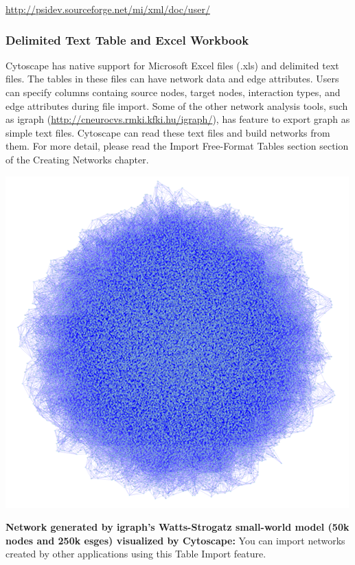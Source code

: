  \url{http://psidev.sourceforge.net/mi/xml/doc/user/}


 
\subsubsection*{Delimited Text Table and Excel Workbook}


 Cytoscape has native support for Microsoft Excel files (.xls) and delimited text files. The tables in these files can have network data and edge attributes. Users can specify columns containg source nodes, target nodes, interaction types, and edge attributes during file import. Some of the other network analysis tools, such as igraph (\url{http://cneurocvs.rmki.kfki.hu/igraph/}), has feature to export graph as simple text files. Cytoscape can read these text files and build networks from them. For more detail, please read the Import Free-Format Tables section section of the Creating Networks chapter. 


 \includegraphics[scale=1]{images/huge_network_igraph.png} 


 \textbf{Network generated by igraph's Watts-Strogatz small-world model (50k nodes and 250k esges) visualized by Cytoscape:}
 You can import networks created by other applications using this Table Import feature. 


